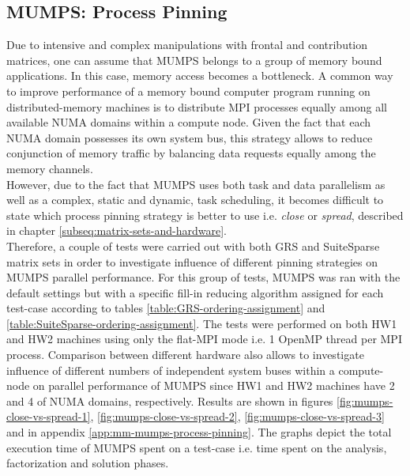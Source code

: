 \subsection{MUMPS: Process Pinning}
\label{subseq:mm-mumps-process-pinning}

Due to intensive and complex manipulations with frontal and contribution matrices, one can assume that MUMPS belongs to a group of memory bound applications. In this case, memory access becomes a bottleneck. A common way to improve performance of a memory bound computer program running on distributed-memory machines is to distribute MPI processes equally among all available NUMA domains within a compute node. Given the fact that each NUMA domain possesses its own system bus, this strategy allows to reduce conjunction of memory traffic by balancing data requests equally among the memory channels.\\


However, due to the fact that MUMPS uses both task and data parallelism as well as a complex, static and dynamic, task scheduling, it becomes difficult to state which process pinning strategy is better to use i.e. \textit{close} or \textit{spread}, described in chapter \ref{subseq:matrix-sets-and-hardware}.\\


Therefore, a couple of tests were carried out with both GRS and SuiteSparse matrix sets in order to investigate influence of different pinning strategies on MUMPS parallel performance. For this group of tests, MUMPS was ran with the default settings but with a specific fill-in reducing algorithm assigned for each test-case according to tables \ref{table:GRS-ordering-assignment} and \ref{table:SuiteSparse-ordering-assignment}. The tests were performed on both HW1 and HW2 machines using only the flat-MPI mode i.e. 1 OpenMP thread per MPI process. Comparison between different hardware also allows to investigate influence of different numbers of independent system buses within a compute-node on parallel performance of MUMPS since HW1 and HW2 machines have 2 and 4 of NUMA domains, respectively. Results are shown in figures \ref{fig:mumps-close-vs-spread-1}, \ref{fig:mumps-close-vs-spread-2}, \ref{fig:mumps-close-vs-spread-3} and in appendix \ref{app:mm-mumps-process-pinning}. The graphs depict the total execution time of MUMPS spent on a test-case i.e. time spent on the analysis, factorization and solution phases.\\

